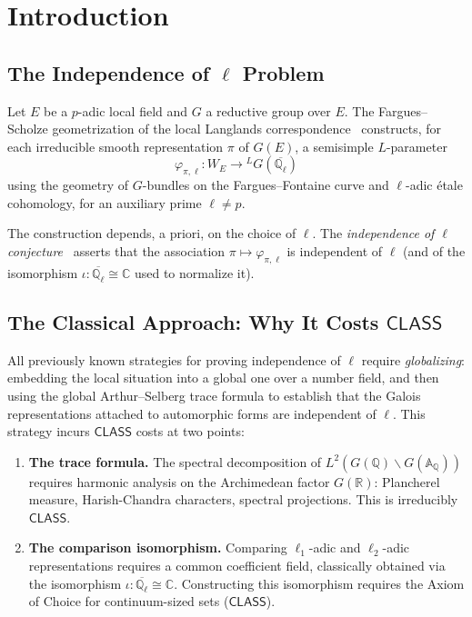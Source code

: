\documentclass[11pt,a4paper]{article}
\theoremstyle{plain}
\theoremstyle{definition}
\newcommand{\CLASS}{\textsf{CLASS}}
\newcommand{\Q}{\mathbb{Q}}
\newcommand{\R}{\mathbb{R}}
\newcommand{\C}{\mathbb{C}}
\newcommand{\A}{\mathbb{A}}
\begin{document}
\tableofcontents
\newpage

\section{Introduction}\label{sec:intro}

\subsection{The Independence of $\ell$ Problem}

Let $E$ be a $p$-adic local field and $G$ a reductive group over $E$. The Fargues--Scholze geometrization of the local Langlands correspondence~\cite{fargues-scholze21} constructs, for each irreducible smooth representation $\pi$ of $G(E)$, a semisimple $L$-parameter
\[
\varphi_{\pi,\ell} : W_E \longrightarrow {}^L G(\overline{\Q_\ell})
\]
using the geometry of $G$-bundles on the Fargues--Fontaine curve and $\ell$-adic \'etale cohomology, for an auxiliary prime $\ell \neq p$.

The construction depends, a priori, on the choice of $\ell$. The \emph{independence of $\ell$ conjecture}~\cite[Conjecture~I.9.5]{fargues-scholze21} asserts that the association $\pi \mapsto \varphi_{\pi,\ell}$ is independent of $\ell$ (and of the isomorphism $\iota: \overline{\Q_\ell} \cong \C$ used to normalize it).

\subsection{The Classical Approach: Why It Costs $\CLASS$}

All previously known strategies for proving independence of $\ell$ require \emph{globalizing}: embedding the local situation into a global one over a number field, and then using the global Arthur--Selberg trace formula to establish that the Galois representations attached to automorphic forms are independent of $\ell$. This strategy incurs $\CLASS$ costs at two points:

\begin{enumerate}[label=(\alph*)]
\item \textbf{The trace formula.} The spectral decomposition of $L^2(G(\Q)\backslash G(\A_\Q))$ requires harmonic analysis on the Archimedean factor $G(\R)$: Plancherel measure, Harish-Chandra characters, spectral projections. This is irreducibly $\CLASS$.
\item \textbf{The comparison isomorphism.} Comparing $\ell_1$-adic and $\ell_2$-adic representations requires a common coefficient field, classically obtained via the isomorphism $\iota: \overline{\Q_\ell} \cong \C$. Constructing this isomorphism requires the Axiom of Choice for continuum-sized sets ($\CLASS$).
\end{enumerate}
\end{document}
